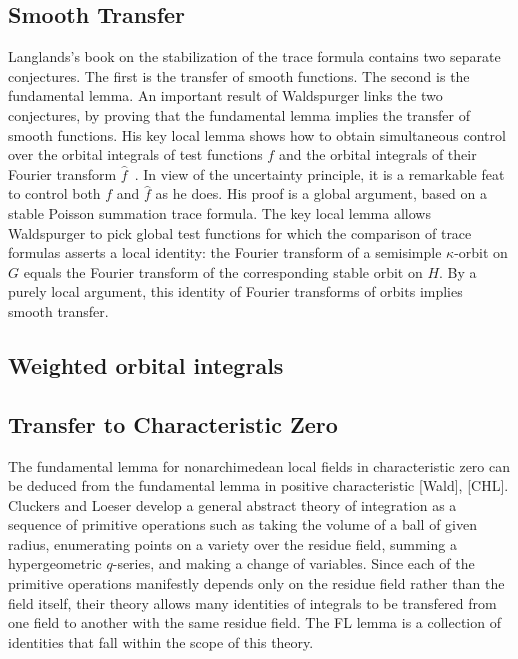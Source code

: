 \documentclass[brochure,english,12pt]{bourbaki}
\begin{document}
\subsection{Smooth Transfer}

Langlands's book on the stabilization of the trace formula contains
two separate conjectures.  The first is the transfer of smooth
functions.  The second is the fundamental lemma.  An important result
of Waldspurger links the two conjectures, by proving that the
fundamental lemma implies the transfer of smooth functions.  
His key local lemma shows how to obtain simultaneous control over the
orbital integrals of test functions $f$ and the orbital integrals of
their Fourier transform $\hat f$~\cite[Prop.~8.2]{W}.  
In view of the uncertainty principle, it is a remarkable feat to
control both $f$ and $\hat f$ as he does.
His proof is a global argument, based on a stable Poisson summation trace
formula.  The key local lemma allows Waldspurger to pick global test
functions for which the comparison of trace formulas asserts a
local identity: the Fourier transform of a semisimple
$\kappa$-orbit on $G$ equals the Fourier transform of the corresponding
stable orbit on $H$.  By a purely local argument, this identity of Fourier
transforms of orbits implies smooth transfer.

\subsection{Weighted orbital integrals}

\subsection{Transfer to Characteristic Zero}

The fundamental lemma for nonarchimedean local fields in
characteristic zero can be deduced from the fundamental lemma in
positive characteristic [Wald], [CHL].  Cluckers and Loeser develop a
general abstract theory of integration as a sequence of primitive
operations such as taking the volume of a ball of given radius,
enumerating points on a variety over the residue field, summing a
hypergeometric $q$-series, and making a change of variables.  Since each
of the primitive operations manifestly depends only on the residue
field rather than the field itself, their theory allows many identities
of integrals to be transfered from one field to another with the same
residue field.  The FL lemma is a collection of identities that fall
within the scope of this theory.
\end{document}
